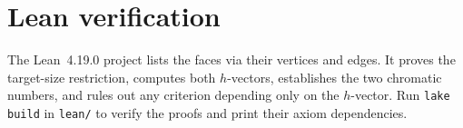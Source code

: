 \documentclass[11pt]{article}
\begin{document}
\section*{Lean verification}

The Lean~4.19.0 project lists the faces via their vertices and edges.
It proves the target-size restriction, computes both \(h\)-vectors,
establishes the two chromatic numbers, and rules out any criterion
depending only on the \(h\)-vector. Run \verb|lake build| in
\verb|lean/| to verify the proofs and print their axiom dependencies.
\end{document}
